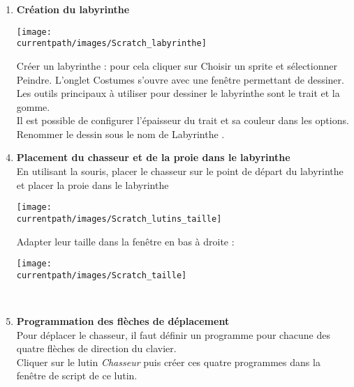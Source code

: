 \begin{changemargin}{-15mm}{-15mm}
\begin{enigme}
\begin{enumerate}
\pagebreak

       \item {\bf Création du labyrinthe} \dotfill \\ 
          \begin{minipage}{9cm}
             \texttt{[image: \\currentpath/images/Scratch\_labyrinthe]}
          \end{minipage}
          \qquad
          \begin{minipage}{6cm}
             Créer un labyrinthe : pour cela cliquer sur \textcolor{B1}{Choisir un sprite} et sélectionner \textcolor{B1}{Peindre}. L'onglet \textcolor{B1}{Costumes} s'ouvre avec une fenêtre permettant de dessiner. \\
             Les outils principaux à utiliser pour dessiner le labyrinthe sont le \textcolor{B1}{trait} et la \textcolor{B1}{gomme}. \\
             Il est possible de configurer l'épaisseur du trait et sa couleur dans les options. \\
             Renommer le dessin sous le nom de \og Labyrinthe \fg.
          \end{minipage}
    \end{enumerate}
 
    \begin{enumerate}
    \setcounter{enumi}{3}
       \item {\bf Placement du chasseur et de la proie dans le labyrinthe} \dotfill \\
       En utilisant la souris, placer le chasseur sur le point de départ du labyrinthe et placer la proie dans le labyrinthe \parbox{2.5cm}{\texttt{[image: \\currentpath/images/Scratch\_lutins\_taille]}} Adapter leur \textcolor{B1}{taille} dans la fenêtre en bas à droite : \parbox{3cm}{\texttt{[image: \\currentpath/images/Scratch\_taille]}} \\ \medskip
 
       \item {\bf Programmation des flèches de déplacement} \dotfill \\
    Pour déplacer le chasseur, il faut définir un programme pour chacune des quatre flèches de direction du clavier. \\
    Cliquer sur le lutin {\it Chasseur} puis créer ces quatre programmes dans la fenêtre de script de ce lutin. \\
 

\end{enumerate}
\end{enigme}
\end{changemargin}
